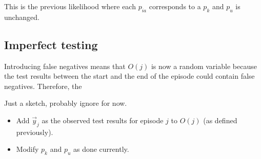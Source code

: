 \documentclass[thesis.tex]{subfiles}
\begin{document}
This is the previous likelihood where each $p_{ia}$ corresponds to a $p_k$ and $p_u$ is unchanged.

\subsection{Imperfect testing}

Introducing false negatives means that $O(j)$ is now a random variable because the test results between the start and the end of the episode could contain false negatives.
Therefore, the 

Just a sketch, probably ignore for now.

\begin{itemize}
  \item Add $\vec{y}_j$ as the observed test results for episode $j$ to $O(j)$ (as defined previously).
  \item Modify $p_k$ and $p_u$ as done currently.
\end{itemize}
\end{document}
